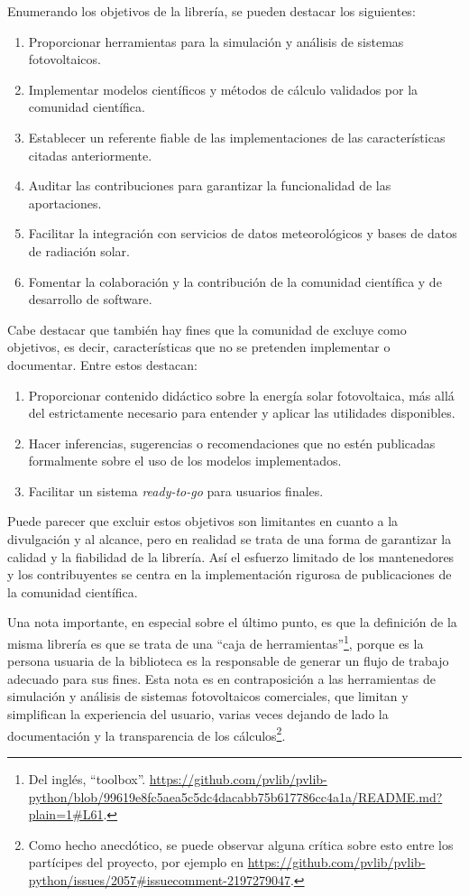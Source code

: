 Enumerando los objetivos de la librería, se pueden destacar los siguientes:

\begin{enumerate}
    \item Proporcionar herramientas para la simulación y análisis de sistemas fotovoltaicos.
    \item Implementar modelos científicos y métodos de cálculo validados por la comunidad científica.
    \item Establecer un referente fiable de las implementaciones de las características citadas anteriormente.
    \item Auditar las contribuciones para garantizar la funcionalidad de las aportaciones.
    \item Facilitar la integración con servicios de datos meteorológicos y bases de datos de radiación solar.
    \item Fomentar la colaboración y la contribución de la comunidad científica y de desarrollo de software.
\end{enumerate}

Cabe destacar que también hay fines que la comunidad de \pvlibpy{} excluye como objetivos, es decir, características que no se pretenden implementar o documentar. Entre estos destacan:

\begin{enumerate}
    \item Proporcionar contenido didáctico sobre la energía solar fotovoltaica, más allá del estrictamente necesario para entender y aplicar las utilidades disponibles.
    \item Hacer inferencias, sugerencias o recomendaciones que no estén publicadas formalmente sobre el uso de los modelos implementados.
    \item Facilitar un sistema \textit{ready-to-go} para usuarios finales.
\end{enumerate}

Puede parecer que excluir estos objetivos son limitantes en cuanto a la divulgación y al alcance, pero en realidad se trata de una forma de garantizar la calidad y la fiabilidad de la librería. Así el esfuerzo limitado de los mantenedores y los contribuyentes se centra en la implementación rigurosa de publicaciones de la comunidad científica.

Una nota importante, en especial sobre el último punto, es que la definición de la misma librería es que se trata de una ``caja de herramientas''\footnote{Del inglés, ``toolbox''. \url{https://github.com/pvlib/pvlib-python/blob/99619e8fc5aea5c5dc4dacabb75b617786cc4a1a/README.md?plain=1\#L61}.}, porque es la persona usuaria de la biblioteca es la responsable de generar un flujo de trabajo adecuado para sus fines. Esta nota es en contraposición a las herramientas de simulación y análisis de sistemas fotovoltaicos comerciales, que limitan y simplifican la experiencia del usuario, varias veces dejando de lado la documentación y la transparencia de los cálculos\footnote{Como hecho anecdótico, se puede observar alguna crítica sobre esto entre los partícipes del proyecto, por ejemplo en \url{https://github.com/pvlib/pvlib-python/issues/2057\#issuecomment-2197279047}.}.

